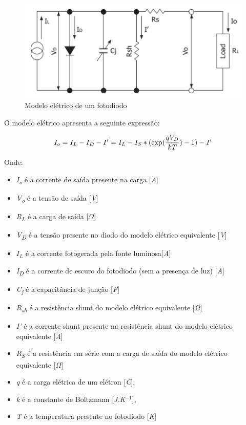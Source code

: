 \begin{figure}[!h]
	\caption{\label{fig_modelofotodiodo}Modelo el\'etrico de um fotodiodo}
	\begin{center}
	    \includegraphics[scale=0.5]{Imagens/ModeloFotodiodo.png}
	\end{center}
	\label{modeloElFotodiodo}
\end{figure}

    O modelo el\'etrico apresenta a seguinte expressão:

\begin{equation}
    \label{eq_modEletFot}
    I_o = I_L - I_D - I\rq = I_L - I_S*(\exp (\frac{qV_D}{kT})-1) - I\rq
\end{equation}

Onde:
\begin{itemize}
    \item \textit{I\textsubscript{o}} \'e a corrente de saída presente na carga [\textit{A}]
    \item \textit{V\textsubscript{o}} \'e a tensão de saída [\textit{V}]
    \item \textit{R\textsubscript{L}} \'e a carga de saída [\textit{$\Omega$}]
    \item \textit{V\textsubscript{D}} \'e a tensão presente no diodo do modelo el\'etrico equivalente [\textit{V}]
    \item $I_L$ \'e a corrente fotogerada pela fonte luminosa[\textit{A}]
    \item  \textit{I\textsubscript{D}} \'e a corrente de escuro do fotodiodo (sem a presença de luz) [\textit{A}]
    \item \textit{C\textsubscript{j}} \'e a capacit\^ancia de junção [\textit{F}]
    \item \textit{R\textsubscript{sh}} \'e a resist\^encia shunt do modelo el\'etrico equivalente [$\Omega$]
    \item \textit{I\rq} \'e a corrente shunt presente na resistência shunt do modelo el\'etrico equivalente [\textit{A}]
    \item \textit{R\textsubscript{S}} \'e a resistência em s\'erie com a carga de saída do modelo el\'etrico equivalente [$\Omega$]
    \item \textit{q} \'e a carga el\'etrica de um el\'etron [\textit{C}],
    \item \textit{k} \'e a constante de Boltzmann [\textit{J.K$^{-1}$}],
    \item \textit{T} \'e a temperatura presente no fotodiodo [\textit{K}]
\end{itemize}

